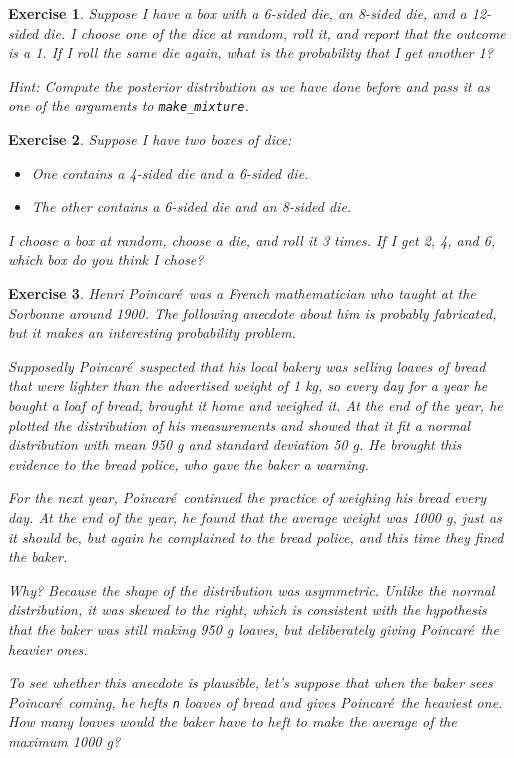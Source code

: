 \documentclass[12pt]{book}
\theoremstyle{exercise}
\newtheorem{exercise}{Exercise}[chapter]
\newcommand{\py}[1]{{\tt #1}}%
\begin{document}
\begin{exercise}
Suppose I have a box with a 6-sided die, an 8-sided die, and a 12-sided die.
I choose one of the dice at random, roll it, and report that the outcome is a 1.
If I roll the same die again, what is the probability that I get another 1?

Hint: Compute the posterior distribution as we have done before and pass it as one of the arguments to \py{make_mixture}.
\end{exercise}


\begin{exercise}
Suppose I have two boxes of dice:

\begin{itemize}
\item One contains a 4-sided die and a 6-sided die.

\item The other contains a 6-sided die and an 8-sided die.
\end{itemize}

I choose a box at random, choose a die, and roll it 3 times.  If I get 2, 4, and 6, which box do you think I chose?
\end{exercise}


\newcommand{\Poincare}{Poincar\'{e}}

\begin{exercise}
Henri \Poincare~was a French mathematician who taught at the Sorbonne around 1900. The following anecdote about him is probably fabricated, but it makes an interesting probability problem.

Supposedly \Poincare~suspected that his local bakery was selling loaves of bread that were lighter than the advertised weight of 1 kg, so every day for a year he bought a loaf of bread, brought it home and weighed it. At the end of the year, he plotted the distribution of his measurements and showed that it fit a normal distribution with mean 950 g and standard deviation 50 g. He brought this evidence to the bread police, who gave the baker a warning.

For the next year, \Poincare~continued the practice of weighing his bread every day. At the end of the year, he found that the average weight was 1000 g, just as it should be, but again he complained to the bread police, and this time they fined the baker.

Why? Because the shape of the distribution was asymmetric. Unlike the normal distribution, it was skewed to the right, which is consistent with the hypothesis that the baker was still making 950 g loaves, but deliberately giving \Poincare~the heavier ones.

To see whether this anecdote is plausible, let's suppose that when the baker sees \Poincare~coming, he hefts \py{n} loaves of bread and gives \Poincare~the heaviest one.  How many loaves would the baker have to heft to make the average of the maximum 1000 g?
\end{exercise}
\end{document}
